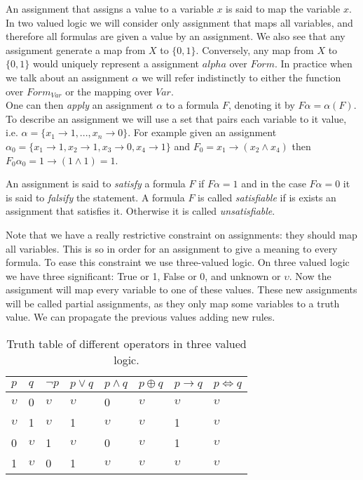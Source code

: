 An assignment that assigns a value to a variable $x$ is said to map the variable $x$. In two valued logic we will consider only assignment that maps all variables, and therefore all formulas are given a value by an assignment. We also see that any assignment generate a map from $X$ to $\{0,1\}$. Conversely, any map from $X$ to $\{0,1\}$ would uniquely represent a assignment $alpha$ over $Form$. In practice when we talk about an assignment $\alpha$ we will refer indistinctly to either the function over $Form_{Var}$ or the mapping  over $Var$.\\

One can then \emph{apply} an assignment $\alpha$ to a formula $F$, denoting it by $F\alpha=\alpha(F)$. To describe an assignment we will use a set that pairs each variable to it value, i.e. $\alpha=\{x_1\to 1,...,x_n\to 0\}$. For example given an assignment $\alpha_0 = \{x_1 \to 1, x_2\to 1, x_3 \to 0, x_4 \to 1\}$ and $F_0=x_1\to (x_2\wedge x_4)$ then  $F_0\alpha_0=1 \to (1\wedge 1)= 1$. \\    

\begin{definition}
  An assignment is said to \emph{satisfy}  a formula $F$ if $F\alpha=1$ and in the case $F  \alpha = 0 $ it is said to \emph{falsify} the statement. A formula $F$ is called \emph{satisfiable} if is exists an assignment that satisfies it. Otherwise it is called \emph{unsatisfiable}.
\end{definition}


Note that we have a really restrictive constraint on assignments: they should map all variables.  This is so in order for an assignment to give a meaning to every formula. To ease this constraint we use three-valued logic. On three valued logic we have three significant: True or 1, False or 0, and unknown or $\upsilon$. Now the assignment will map every variable to one of these values. These new assignments will be called partial assignments, as they only map some variables to a truth value. We can propagate the previous values adding new rules.

\begin{table}[h]
  \begin{center}
    \begin{tabular}{|l|l|l|l|l|l|l|l|}
      \hline
      $p$ & $q$ & $\neg p$& $p\vee q$ & $p\wedge q$ & $p \oplus q$ & $p \to q $  & $p \iff q$  \\ 
      \hline
      
      $\upsilon$ & 0 & $\upsilon$ & $\upsilon$ & 0 & $\upsilon$ & $\upsilon$ & $\upsilon$\\
      $\upsilon$ & 1 & $\upsilon$ & 1 & $\upsilon$ & $\upsilon$ & 1 &$\upsilon$\\
      0 & $\upsilon$ & 1 & $\upsilon$ & 0 & $\upsilon$ & 1 &$\upsilon$\\
      1 & $\upsilon$ & 0 & 1 & $\upsilon$ & $\upsilon$ & $\upsilon$ &$\upsilon$\\
      \hline

    \end{tabular}
  \end{center}
  \caption{\label{tab:table-name}Truth table of different operators in three valued logic.}
\end{table}


